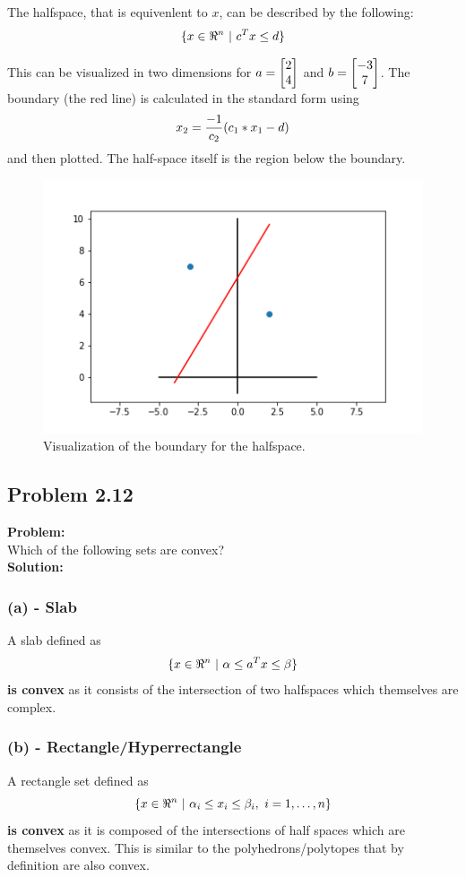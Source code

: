 \documentclass[letter]{article}
\begin{document}
The halfspace, that is equivenlent to $x$, can be described by the following:
\begin{equation}
	\{x\in \real^n \ | \ c^T x \leq d\}
\end{equation}

This can be visualized in two dimensions for $a = \mqty[2\\4]$ and $b = \mqty[-3\\7]$. The boundary (the red line) is calculated in the standard form using $$x_2 = \frac{-1}{c_2} \qty(c_1 * x_1 - d)$$ and then plotted. The half-space itself is the region below the boundary.

\begin{figure}[h]
	\centering
	\includegraphics[width = 0.7\linewidth]{fig/pblm2_7}
	\caption{Visualization of the boundary for the halfspace.}
	\label{fig:pblm2_7}
\end{figure}


\subsection{Problem 2.12}
\textbf{Problem:}\\
Which of the following sets are convex?\\

\noindent
\textbf{Solution:}
\subsubsection{(a) - Slab}
A slab defined as $$\{x \in \real^n \ | \ \alpha \leq a^T x \leq \beta\}$$ \textbf{is convex} as it consists of the intersection of two halfspaces which themselves are complex.

\subsubsection{(b) - Rectangle/Hyperrectangle}
A rectangle set defined as $$\{x \in \real^n \ | \ \alpha_i \leq x_i \leq \beta_i, \ i = 1,\dots,n\}$$ \textbf{is convex} as it is composed of the intersections of half spaces which are themselves convex. This is similar to the polyhedrons/polytopes that by definition are also convex.
\end{document}
